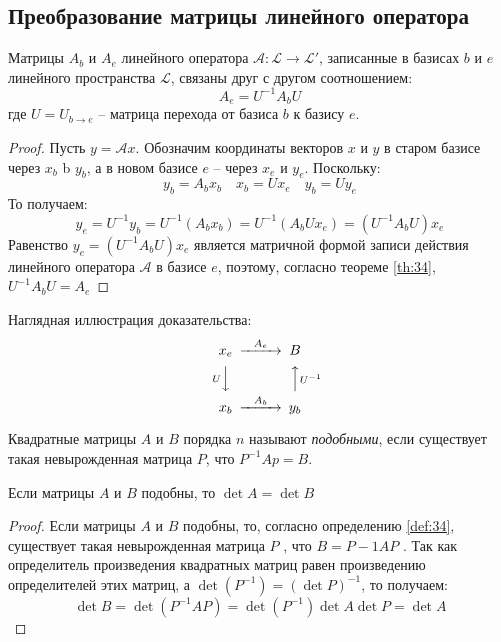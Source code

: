 \subsection{Преобразование матрицы линейного оператора}

\begin{theorem}
  Матрицы $A_b$ и  $A_e$ линейного оператора $\mathcal{A} : \mathcal{L} \to \mathcal{L}'$, записанные в базисах $b$ и  $e$ линейного пространства  $\mathcal{L}$, связаны друг с другом соотношением: \[
    A_e = U^{-1} A_b U
  \]
  где $U = U_{b \to e}$ -- матрица перехода от базиса $b$ к базису $e$.
\end{theorem}
\begin{proof}
  Пусть $y = \mathcal{A} x$. Обозначим координаты векторов $x$ и $y$ в старом базисе через  $x_b$ b  $y_b$, а в новом базисе $e$ -- через $x_e$ и $y_e$. Поскольку: \[
    y_b = A_b x_b \quad x_b = U x_e \quad y_b = U y_e
  \] 
  То получаем: \[
    y_e = U^{-1}y_b = U^{-1}(A_b x_b) = U^{-1}(A_b U x_e) = (U^{-1} A_b U) x_e
  \] 
  Равенство $y_e = (U^{-1} A_b U) x_e$ является матричной формой записи действия линейного оператора $\mathcal{A}$ в базисе $e$, поэтому, согласно теореме \ref{th:34}, $U^{-1} A_b U = A_e$
\end{proof}

Наглядная иллюстрация доказательства:
\begin{gather*}
  \begin{CD}
    x_e    @>A_e>>  B \\
    @VUVV           @AAU^{-1}A \\
    x_b   @>A_b>> y_b
\end{CD}
\end{gather*}

\begin{definition}
  Квадратные матрицы $A$ и $B$ порядка $n$ называют \textit{подобными}, если существует такая невырожденная матрица $P$, что $P^{-1} Ap = B$.
\end{definition}

\begin{theorem}
  \label{def:34}
  Если матрицы $A$ и $B$ подобны, то $\det A = \det B$
\end{theorem}
\begin{proof}
  Если матрицы $A$ и $B$ подобны, то, согласно определению \ref{def:34}, существует такая невырожденная матрица $P$ , что $B = P −1AP$ . Так как определитель произведения квадратных матриц равен произведению определителей этих матриц, а $\det(P^{−1}) = (\det P)^{-1}$, то получаем: \[
  \det B = \det \left( P^{-1} AP \right) = \det\left( P^{-1} \right) \det A \det P = \det A
  \] 
\end{proof}


